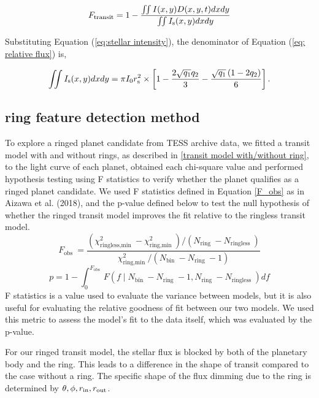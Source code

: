 \documentclass[fleqn,usenatbib, onecolumn,dvipdfmx]{mnras}
\begin{document}
\begin{equation} \label{eq: relative flux}
F_{\rm{transit}}= 1 - \frac{\iint I(x, y)D(x,y,t) d x d y}{\iint I_{\mathrm{s}}(x, y) d x d y}
\end{equation}

Substituting Equation (\ref{eq:stellar intensity}), the denominator of Equation (\ref{eq: relative flux}) is,

\begin{equation} \label{eq: total flux}
\iint I_{\mathrm{s}}(x, y) d x d y=\pi I_0 r_{\rm{s}}^2 \times\left[1-\frac{2 \sqrt{q_1} q_2}{3}-\frac{\sqrt{q_1}\left(1-2 q_2\right)}{6}\right].
\end{equation}



\subsection{ring feature detection method} \label{ring feature detection method}
To explore a ringed planet candidate from TESS archive data, we fitted a transit model with and without rings, as described in \ref{transit model with/without ring}, to the light curve of each planet, obtained each chi-square value and performed hypothesis testing using F statistics to verify whether the planet qualifies as a ringed planet candidate.
We used F statistics defined in Equation \ref{F_obs} as in Aizawa et al. (2018), and the p-value defined below to test the null hypothesis of whether the ringed transit model improves the fit relative to the ringless transit model.
\begin{equation}\label{F_obs}
F_{\text {obs }}=\frac{\left(\chi_{\text {ringless,min }}^2-\chi_{\text {ring,min }}^2\right) /\left(N_{\text {ring }}-N_{\text {ringless }}\right)}{\chi_{\text {ring,min }}^2 /\left(N_{\text {bin }}-N_{\text {ring }}-1\right)}
\end{equation}
\begin{equation}\label{p_value}
p=1-\int_0^{F_{\text {obs }}} F\left(f \mid N_{\text {bin }}-N_{\text {ring }}-1, N_{\text {ring }}-N_{\text {ringless }}\right) d f
\end{equation}
F statistics is a value used to evaluate the variance between models, but it is also useful for evaluating the relative goodness of fit between our two models. We used this metric to assess the model's fit to the data itself, which was evaluated by the p-value. 

For our ringed transit model, the stellar flux is blocked by both of the planetary body and the ring. This leads to a difference in the shape of transit compared to the case without a ring. The specific shape of the flux dimming due to the ring is determined by $\theta, \phi, r_{\rm{in}}, r_{\rm{out}}$. 
\end{document}
